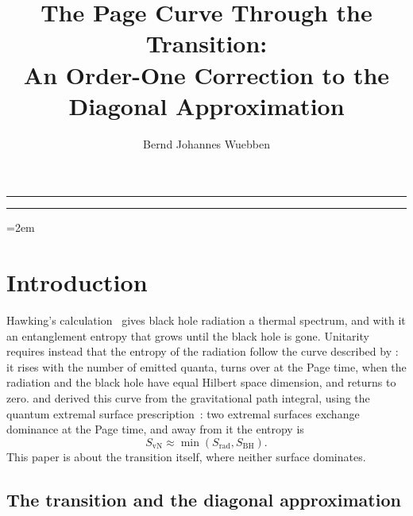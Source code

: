 \documentclass[11pt,letterpaper]{article}
\title{The Page Curve Through the Transition:\\
An Order-One Correction to the Diagonal Approximation}
\author{Bernd Johannes Wuebben}
\affiliation{New York, NY, USA}
\theoremstyle{plain}
\theoremstyle{definition}
\theoremstyle{remark}
\begin{document}
\notoc
\maketitle

\clearpage
{}
\setcounter{page}{1}
\hrule
\tableofcontents
\afterTocSpace
\hrule
\afterTocRuleSpace
\clearpage
{}
\setcounter{page}{1}

\emergencystretch=2em



\section{Introduction}
\label{sec01:introduction}

Hawking's calculation~\citep{hawking1975} gives black hole radiation a thermal spectrum, and with it an entanglement entropy that grows until the black hole is gone. Unitarity requires instead that the entropy of the radiation follow the curve described by \citet{page1993entropy, page1993info}: it rises with the number of emitted quanta, turns over at the Page time, when the radiation and the black hole have equal Hilbert space dimension, and returns to zero. \citet{penington2020} and \citet{almheirietal2019} derived this curve from the gravitational path integral, using the quantum extremal surface prescription~\citep{ryutakayanagi2006, lewkowyczmaldacena2013, engelhardtwall2015}: two extremal surfaces exchange dominance at the Page time, and away from it the entropy is
\begin{equation}
\label{eq01:min_formula}
S_{\mathrm{vN}} \approx \min(S_{\mathrm{rad}}, S_{\mathrm{BH}}) .
\end{equation}
This paper is about the transition itself, where neither surface dominates.

\subsection{The transition and the diagonal approximation}
\label{subsec01:page_curve}
\end{document}
